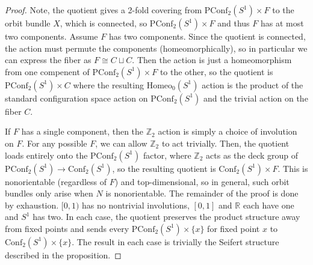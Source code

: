 \documentclass[10pt, oneside]{article}
\newcommand{\Z}{\mathbb{Z}}
\newcommand{\homeo}[1][S^1]{\text{Homeo}_0(#1)}
\newcommand{\conf}[2][S^1]{\text{Conf}_{#2}(#1)}
\newcommand{\pconf}[2][S^1]{\text{PConf}_{#2}(#1)}
\theoremstyle{definition}
\theoremstyle{definition}
\begin{document}
\begin{proof}
    Note, 
    the quotient gives a 2-fold covering 
    from $\pconf{2}\times F$ 
    to the orbit bundle $X$, 
    which is connected, 
    so $\pconf{2}\times F$ 
    and thus $F$ has at most two components. 
    Assume $F$ has two components. 
    Since the quotient is connected, 
    the action must permute the components (homeomorphically), 
    so in particular we can express the fiber 
    as $F\cong C\sqcup C$. 
    Then the action is just a homeomorphism 
    from one compenent of $\pconf{2}\times F$ to the other, 
    so the quotient is $\pconf{2}\times C$ 
    where the resulting $\homeo$ action is the product of the standard configuration space action on $\pconf{2}$ and the trivial action on the fiber $C$.

    If $F$ has a single component, 
    then the $\Z_2$ action is simply a choice of involution on $F$. For any possible $F$, 
    we can allow $\Z_2$ to act trivially. 
    Then, 
    the quotient loads entirely 
    onto the $\pconf{2}$ factor, 
    where $\Z_2$ acts as the deck group of $\pconf{2}\to\conf{2}$, 
    so the resulting quotient is $\conf{2}\times F$. 
    This is nonorientable (regardless of $F$) and top-dimensional, 
    so in general, 
    such orbit bundles only arise when $N$ is nonorientable. 
    The remainder of the proof is done by exhaustion. 
    $[0,1)$ has no nontrivial involutions, 
    $[0,1]$ and $\mathbb{R}$ each have one 
    and $S^1$ has two. 
    In each case, 
    the quotient preserves the product structure 
    away from fixed points 
    and sends every $\pconf{2} \times \{x\}$ 
    for fixed point $x$ 
    to $\conf{2}\times \{x\}$. 
    The result in each case is trivially the Seifert structure described in the proposition.
\end{proof}
\end{document}
